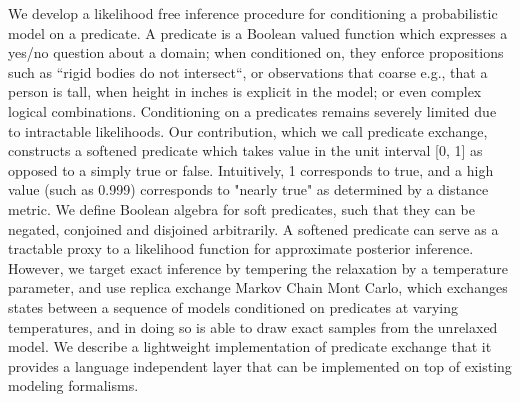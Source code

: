 We develop a likelihood free inference procedure for conditioning a probabilistic model on a predicate.
A predicate is a Boolean valued function which expresses a yes/no question about a domain; when conditioned on, they enforce propositions such as ``rigid bodies do not intersect``, or observations that coarse e.g., that a person is tall, when height in inches is explicit in the model; or even complex logical combinations.
Conditioning on a predicates remains severely limited due to intractable likelihoods.
Our contribution, which we call predicate exchange, 
constructs a softened predicate which takes value in the unit interval [0, 1] as opposed to a simply true or false. Intuitively, 1 corresponds to true, and a high value (such as 0.999) corresponds to "nearly true" as determined by a distance metric.
We define Boolean algebra for soft predicates,  such that they can be negated, conjoined and disjoined arbitrarily.
A softened predicate can serve as a tractable proxy to a likelihood function for approximate posterior inference.
However, we target exact inference by tempering the relaxation by a temperature parameter, and use replica exchange Markov Chain Mont Carlo, which exchanges states between a sequence of models conditioned on predicates at varying temperatures, and in doing so is able to draw exact samples from the unrelaxed model.
We describe a lightweight implementation of predicate exchange that it provides a language independent layer that can be implemented on top of existing modeling formalisms.


% 
